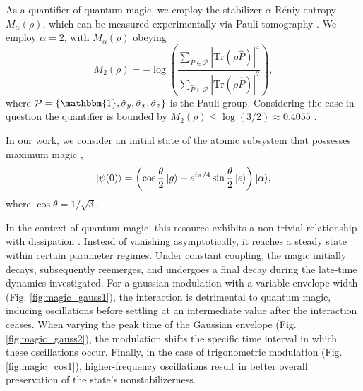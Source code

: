 \documentclass[aps,pre,superscriptaddress,twocolumn,10pt]{revtex4-2}
\begin{document}
As a quantifier of quantum magic, we employ the stabilizer $\alpha$-Réniy entropy  \cite{Leone2022,Brokemeier2025,Mittal2026} $M_\alpha(\rho)$, which can be measured experimentally via Pauli tomography \cite{Oliviero2022}.
We employ $\alpha=2$,  with $M_\alpha(\rho)$ obeying
\begin{equation}
M_2(\rho) =-\log \left( \frac{\sum_{\hat{P} \in \mathcal{P}} |\mathrm{Tr}(\rho \hat{P})|^{4}}{\sum_{\hat{P} \in \mathcal{P}} |\mathrm{Tr}(\rho \hat{P}) |^2} \right),
\end{equation}
where $\mathcal{P}=\{\mathbbm{1},\hat{\sigma}_y,\hat{\sigma}_x,\hat{\sigma}_z \}$ is the Pauli group.
Considering the case in question the quantifier is bounded by $M_2(\rho)\leq \log(3/2)\approx0.4055$ \cite{Wang2023}.

In our work, we consider an initial state of the atomic subsystem that possesses maximum magic \cite{Bravyi2005,Haug2026}, 
\begin{equation} \label{eq:max_magic}
\ket{\psi(0)} = \left(\cos\frac{\theta}{2}\ket{g} + e^{i\pi/4}\sin\frac{\theta}{2}\ket{e}\right)|\alpha \rangle,
\end{equation}
where $\cos\theta = 1/\sqrt{3}$.

In the context of quantum magic, this resource exhibits a non-trivial relationship with dissipation \cite{Oliviero2022,Mittal2026}. 
Instead of vanishing asymptotically, it reaches a steady state within certain parameter regimes. 
Under constant coupling, the magic initially decays, subsequently reemerges, and undergoes a final decay during the late-time dynamics investigated.
For a gaussian modulation with a variable envelope width (Fig. \ref{fig:magic_gauss1}), the interaction is detrimental to quantum magic, inducing oscillations before settling at an intermediate value after the interaction ceases. When varying the peak time of the Gaussian envelope (Fig. \ref{fig:magic_gauss2}), the modulation shifts the specific time interval in which these oscillations occur. Finally, in the case of trigonometric modulation (Fig. \ref{fig:magic_cos1}), higher-frequency oscillations result in better overall preservation of the state's nonstabilizerness.
\end{document}
